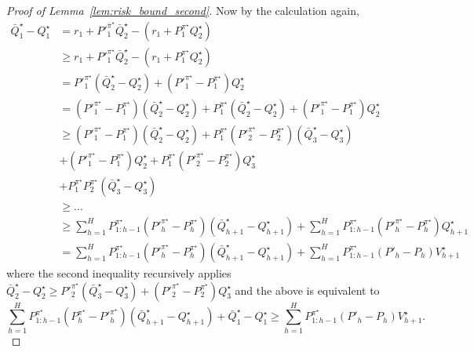 \begin{proof}[Proof of Lemma~\ref{lem:risk_bound_second}]
Now by the calculation again,
\begin{equation}\label{eqn:decomp}
\begin{aligned}
\bar{Q}_1^\star-Q^\star_1&=r_1+P'^{\bar{\pi}^\star}_1\bar{Q}_2^\star-\left(r_1+P^{{\pi}^\star}_1{Q}_2^\star\right)\\
&\geq r_1+P'^{{\pi}^\star}_1\bar{Q}_2^\star-\left(r_1+P^{{\pi}^\star}_1{Q}_2^\star\right)\\
&=P'^{{\pi}^\star}_1\left(\bar{Q}_2^\star-{Q}_2^\star\right)+\left(P'^{{\pi}^\star}_1-P^{{\pi}^\star}_1\right){Q}_2^\star\\
&=\left(P'^{{\pi}^\star}_1-P^{{\pi}^\star}_1\right)\left(\bar{Q}_2^\star-{Q}_2^\star\right)+P^{{\pi}^\star}_1\left(\bar{Q}_2^\star-{Q}_2^\star\right)+\left(P'^{{\pi}^\star}_1-P^{{\pi}^\star}_1\right){Q}_2^\star\\
&\geq\left(P'^{{\pi}^\star}_1-P^{{\pi}^\star}_1\right)\left(\bar{Q}_2^\star-{Q}_2^\star\right)+P^{{\pi}^\star}_1\left(P'^{{\pi}^\star}_2-P^{{\pi}^\star}_2\right)\left(\bar{Q}_3^\star-{Q}_3^\star\right)\\
&+\left(P'^{{\pi}^\star}_1-P^{{\pi}^\star}_1\right){Q}_2^\star+P^{{\pi}^\star}_1\left(P'^{{\pi}^\star}_2-P^{{\pi}^\star}_2\right){Q}_3^\star\\
&+P^{{\pi}^\star}_1P^{{\pi}^\star}_2\left(\bar{Q}_3^\star-{Q}_3^\star\right)\\
&\geq\ldots\\
&\geq\sum_{h=1}^H P^{{\pi}^\star}_{1:h-1}\left(P'^{{\pi}^\star}_h-P^{{\pi}^\star}_h\right)\left(\bar{Q}_{h+1}^\star-{Q}_{h+1}^\star\right)+\sum_{h=1}^HP^{{\pi}^\star}_{1:h-1}\left(P'^{{\pi}^\star}_h-P^{{\pi}^\star}_h\right){Q}_{h+1}^\star\\
&=\sum_{h=1}^H P^{{\pi}^\star}_{1:h-1}\left(P'^{{\pi}^\star}_h-P^{{\pi}^\star}_h\right)\left(\bar{Q}_{h+1}^\star-{Q}_{h+1}^\star\right)+\sum_{h=1}^HP^{{\pi}^\star}_{1:h-1}\left(P'_h-P_h\right){V}_{h+1}^\star
\end{aligned}
\end{equation}
where the second inequality recursively applies $\bar{Q}_2^\star-Q^\star_2\geq P'^{{\pi}^\star}_2\left(\bar{Q}_3^\star-{Q}_3^\star\right)+\left(P'^{{\pi}^\star}_2-P^{{\pi}^\star}_2\right){Q}_3^\star$ and the above is equivalent to 
\[
\sum_{h=1}^H P^{{\pi}^\star}_{1:h-1}\left(P^{{\pi}^\star}_h-P'^{{\pi}^\star}_h\right)\left(\bar{Q}_{h+1}^\star-{Q}_{h+1}^\star\right)+\bar{Q}_1^\star-Q^\star_1\geq \sum_{h=1}^HP^{{\pi}^\star}_{1:h-1}\left(P'_h-P_h\right){V}_{h+1}^\star.
\]


\end{proof}
